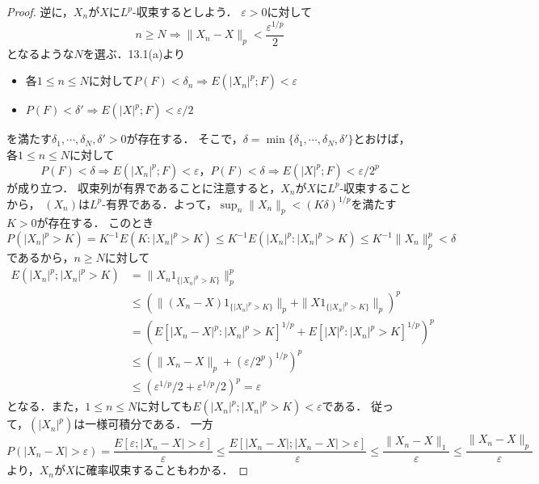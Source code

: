\documentclass{jsarticle}
\begin{document}
\begin{proof}
逆に，$X_n$が$X$に$L^p$-収束するとしよう．
$\varepsilon>0$に対して
\[
n\geq N\Rightarrow\|X_n-X\|_p<\frac{\varepsilon^{1/p}}{2}
\]
となるような$N$を選ぶ．13.1(a)より
\begin{itemize}
\item 各$1\leq n\leq N$に対して$P(F)<\delta_n\Rightarrow E(|X_n|^p;F)<\varepsilon$
\item $P(F)<\delta'\Rightarrow E(|X|^p;F)<\varepsilon/2$
\end{itemize}
を満たす$\delta_1,\cdots,\delta_N,\delta'>0$が存在する．
そこで，$\delta=\min\{\delta_1,\cdots,\delta_N,\delta'\}$とおけば，
各$1\leq n\leq N$に対して
\[
P(F)<\delta\Rightarrow E(|X_n|^p;F)<\varepsilon，
P(F)<\delta\Rightarrow E(|X|^p;F)<\varepsilon/2^p
\]
が成り立つ．
収束列が有界であることに注意すると，$X_n$が$X$に$L^p$-収束することから，
$(X_n)$は$L^p$-有界である．よって，$\sup_n\|X_n\|_p<(K\delta)^{1/p}$を満たす$K>0$が存在する．
このとき
\[
P(|X_n|^p>K)=K^{-1}E(K:|X_n|^p>K)
\leq K^{-1}E(|X_n|^p:|X_n|^p>K)
\leq K^{-1}\|X_n\|_p^p<\delta
\]
であるから，$n\geq N$に対して
\begin{align*}
E(|X_n|^p;|X_n|^p>K)
&=\|X_n1_{\{|X_n|^p>K\}}\|_p^p \\
&\leq(\|(X_n-X)1_{\{|X_n|^p>K\}}\|_p+\|X1_{\{|X_n|^p>K\}}\|_p)^p \\
&=(E[|X_n-X|^p:|X_n|^p>K]^{1/p}+E[|X|^p:|X_n|^p>K]^{1/p})^p \\
&\leq(\|X_n-X\|_p+(\varepsilon/2^p)^{1/p})^p \\
&\leq(\varepsilon^{1/p}/2+\varepsilon^{1/p}/2)^p=\varepsilon
\end{align*}
となる．また，$1\leq n\leq N$に対しても$E(|X_n|^p;|X_n|^p>K)<\varepsilon$である．
従って，$(|X_n|^p)$は一様可積分である．
一方
\[
P(|X_n-X|>\varepsilon)
=\frac{E[\varepsilon;|X_n-X|>\varepsilon]}{\varepsilon}
\leq\frac{E[|X_n-X|;|X_n-X|>\varepsilon]}{\varepsilon}
\leq\frac{\|X_n-X\|_1}{\varepsilon}
\leq\frac{\|X_n-X\|_p}{\varepsilon}
\]
より，$X_n$が$X$に確率収束することもわかる．
\end{proof}
\end{document}

